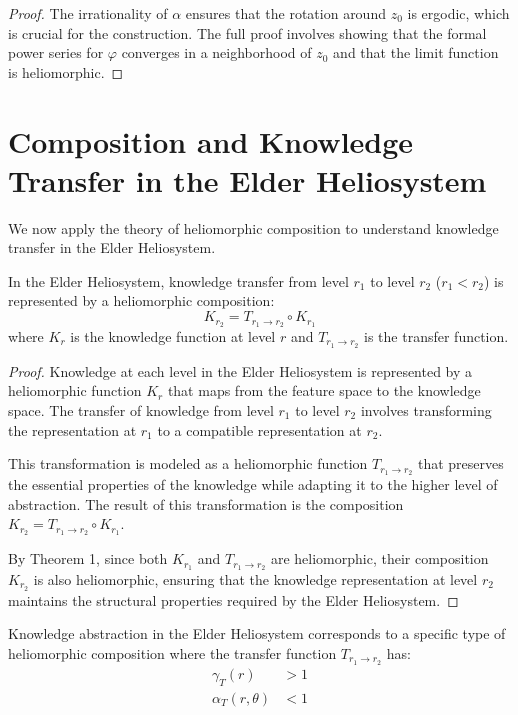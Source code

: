 \begin{definition}
\begin{enumerate}
\begin{definition}
\begin{definition}
\begin{proof}
The irrationality of $\alpha$ ensures that the rotation around $z_0$ is ergodic, which is crucial for the construction. The full proof involves showing that the formal power series for $\varphi$ converges in a neighborhood of $z_0$ and that the limit function is heliomorphic.
\end{proof}

\section{Composition and Knowledge Transfer in the Elder Heliosystem}

We now apply the theory of heliomorphic composition to understand knowledge transfer in the Elder Heliosystem.

\begin{theorem}
In the Elder Heliosystem, knowledge transfer from level $r_1$ to level $r_2$ ($r_1 < r_2$) is represented by a heliomorphic composition:
\begin{equation}
K_{r_2} = T_{r_1 \to r_2} \circ K_{r_1}
\end{equation}
where $K_r$ is the knowledge function at level $r$ and $T_{r_1 \to r_2}$ is the transfer function.
\end{theorem}

\begin{proof}
Knowledge at each level in the Elder Heliosystem is represented by a heliomorphic function $K_r$ that maps from the feature space to the knowledge space. The transfer of knowledge from level $r_1$ to level $r_2$ involves transforming the representation at $r_1$ to a compatible representation at $r_2$.

This transformation is modeled as a heliomorphic function $T_{r_1 \to r_2}$ that preserves the essential properties of the knowledge while adapting it to the higher level of abstraction. The result of this transformation is the composition $K_{r_2} = T_{r_1 \to r_2} \circ K_{r_1}$.

By Theorem 1, since both $K_{r_1}$ and $T_{r_1 \to r_2}$ are heliomorphic, their composition $K_{r_2}$ is also heliomorphic, ensuring that the knowledge representation at level $r_2$ maintains the structural properties required by the Elder Heliosystem.
\end{proof}

\begin{theorem}
Knowledge abstraction in the Elder Heliosystem corresponds to a specific type of heliomorphic composition where the transfer function $T_{r_1 \to r_2}$ has:
\begin{align}
\gamma_T(r) &> 1\\
\alpha_T(r,\theta) &< 1
\end{align}
\end{theorem}


\end{definition}
\end{definition}
\end{enumerate}
\end{definition}
